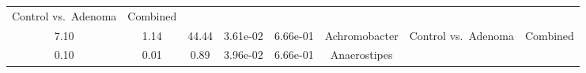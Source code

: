 \documentclass[12pt,]{article}
\begin{document}
\begin{longtable}[]{@{}cccccccc@{}}
\begin{minipage}[t]{0.14\columnwidth}
Control vs.~Adenoma\strut
\end{minipage} & \begin{minipage}[t]{0.09\columnwidth}\centering\strut
Combined\strut
\end{minipage}\tabularnewline
\begin{minipage}[t]{0.05\columnwidth}\centering\strut
7.10\strut
\end{minipage} & \begin{minipage}[t]{0.09\columnwidth}\centering\strut
1.14\strut
\end{minipage} & \begin{minipage}[t]{0.09\columnwidth}\centering\strut
44.44\strut
\end{minipage} & \begin{minipage}[t]{0.07\columnwidth}\centering\strut
3.61e-02\strut
\end{minipage} & \begin{minipage}[t]{0.07\columnwidth}\centering\strut
6.66e-01\strut
\end{minipage} & \begin{minipage}[t]{0.20\columnwidth}\centering\strut
Achromobacter\strut
\end{minipage} & \begin{minipage}[t]{0.14\columnwidth}\centering\strut
Control vs.~Adenoma\strut
\end{minipage} & \begin{minipage}[t]{0.09\columnwidth}\centering\strut
Combined\strut
\end{minipage}\tabularnewline
\begin{minipage}[t]{0.05\columnwidth}\centering\strut
0.10\strut
\end{minipage} & \begin{minipage}[t]{0.09\columnwidth}\centering\strut
0.01\strut
\end{minipage} & \begin{minipage}[t]{0.09\columnwidth}\centering\strut
0.89\strut
\end{minipage} & \begin{minipage}[t]{0.07\columnwidth}\centering\strut
3.96e-02\strut
\end{minipage} & \begin{minipage}[t]{0.07\columnwidth}\centering\strut
6.66e-01\strut
\end{minipage} & \begin{minipage}[t]{0.20\columnwidth}\centering\strut
Anaerostipes\strut
\end{minipage} & \begin{minipage}[t]{0.14\columnwidth}\centering\strut

\end{minipage}
\end{longtable}
\end{document}
